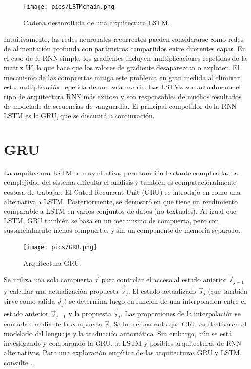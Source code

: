 \begin{figure}[h]
  \centering
  \texttt{[image: pics/LSTMchain.png]}
  \caption{Cadena desenrollada de una arquitectura LSTM.}
\end{figure}

Intuitivamente, las redes neuronales recurrentes pueden considerarse como redes de alimentación profunda con parámetros compartidos entre diferentes capas. En el caso de la RNN simple, los gradientes incluyen multiplicaciones repetidas de la matriz $W$, lo que hace que los valores de gradiente desaparezcan o exploten. El mecanismo de las compuertas mitiga este problema en gran medida al eliminar esta multiplicación repetida de una sola matriz. Las LSTMs son actualmente el tipo de arquitectura RNN más exitoso y son responsables de muchos resultados de modelado de secuencias de vanguardia. El principal competidor de la RNN LSTM es la GRU, que se discutirá a continuación.

\section{GRU}
La arquitectura LSTM es muy efectiva, pero también bastante complicada. La complejidad del sistema dificulta el análisis y también es computacionalmente costosa de trabajar. El Gated Recurrent Unit (GRU) se introdujo en \cite{cho2014learning} como una alternativa a LSTM. Posteriormente, se demostró en \cite{chung2014empirical} que tiene un rendimiento comparable a LSTM en varios conjuntos de datos (no textuales). Al igual que LSTM, GRU también se basa en un mecanismo de compuerta, pero con sustancialmente menos compuertas y sin un componente de memoria separado.

\begin{figure}[h]
  \centering
  \texttt{[image: pics/GRU.png]}
  \caption{Arquitectura GRU.}
\end{figure}

Se utiliza una sola compuerta $\vec{r}$ para controlar el acceso al estado anterior $\vec{s}_{j-1}$ y calcular una actualización propuesta $\vec{\widetilde{s}}_j$. El estado actualizado $\vec{s}_j$ (que también sirve como salida $\vec{y}_j$) se determina luego en función de una interpolación entre el estado anterior $\vec{s}_{j-1}$ y la propuesta $\vec{\widetilde{s}}_j$. Las proporciones de la interpolación se controlan mediante la compuerta $\vec{z}$. Se ha demostrado que GRU es efectivo en el modelado del lenguaje y la traducción automática. Sin embargo, aún se está investigando y comparando la GRU, la LSTM y posibles arquitecturas de RNN alternativas. Para una exploración empírica de las arquitecturas GRU y LSTM, consulte \cite{jozefowicz2015empirical}.

